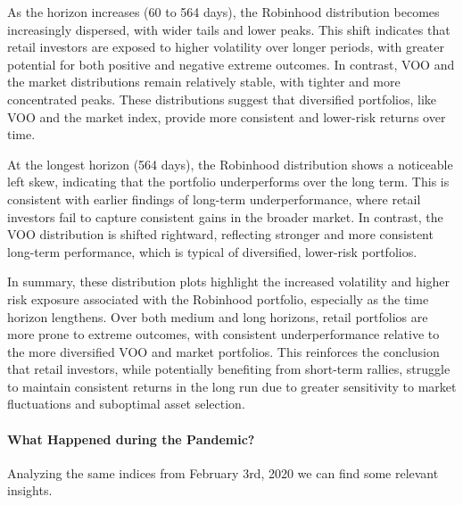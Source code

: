 As the horizon increases (60 to 564 days), the Robinhood distribution becomes increasingly dispersed, with wider tails and lower peaks. This shift indicates that retail investors are exposed to higher volatility over longer periods, with greater potential for both positive and negative extreme outcomes. In contrast, VOO and the market distributions remain relatively stable, with tighter and more concentrated peaks. These distributions suggest that diversified portfolios, like VOO and the market index, provide more consistent and lower-risk returns over time.

At the longest horizon (564 days), the Robinhood distribution shows a noticeable left skew, indicating that the portfolio underperforms over the long term. This is consistent with earlier findings of long-term underperformance, where retail investors fail to capture consistent gains in the broader market. In contrast, the VOO distribution is shifted rightward, reflecting stronger and more consistent long-term performance, which is typical of diversified, lower-risk portfolios.

In summary, these distribution plots highlight the increased volatility and higher risk exposure associated with the Robinhood portfolio, especially as the time horizon lengthens. Over both medium and long horizons, retail portfolios are more prone to extreme outcomes, with consistent underperformance relative to the more diversified VOO and market portfolios. This reinforces the conclusion that retail investors, while potentially benefiting from short-term rallies, struggle to maintain consistent returns in the long run due to greater sensitivity to market fluctuations and suboptimal asset selection.
\paragraph{What Happened during the Pandemic?} Analyzing the same indices from February 3rd, 2020 we can find some relevant insights. 

